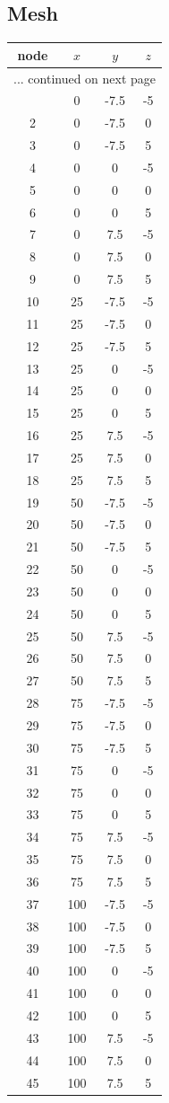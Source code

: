 \documentclass{article}%
\begin{document}
\subsection{Mesh}%
\label{subsec:Mesh}%
\begin{longtable}{| c | c c c |}%
\hline%
node&$x$&$y$&$z$\\%
\hline%
\endhead%
\hline%
\multicolumn{4}{r}{... continued on next page}\\%
\endfoot%
\hline%
\endlastfoot%
1&0&{-}7.5&{-}5\\%
2&0&{-}7.5&0\\%
3&0&{-}7.5&5\\%
4&0&0&{-}5\\%
5&0&0&0\\%
6&0&0&5\\%
7&0&7.5&{-}5\\%
8&0&7.5&0\\%
9&0&7.5&5\\%
10&25&{-}7.5&{-}5\\%
11&25&{-}7.5&0\\%
12&25&{-}7.5&5\\%
13&25&0&{-}5\\%
14&25&0&0\\%
15&25&0&5\\%
16&25&7.5&{-}5\\%
17&25&7.5&0\\%
18&25&7.5&5\\%
19&50&{-}7.5&{-}5\\%
20&50&{-}7.5&0\\%
21&50&{-}7.5&5\\%
22&50&0&{-}5\\%
23&50&0&0\\%
24&50&0&5\\%
25&50&7.5&{-}5\\%
26&50&7.5&0\\%
27&50&7.5&5\\%
28&75&{-}7.5&{-}5\\%
29&75&{-}7.5&0\\%
30&75&{-}7.5&5\\%
31&75&0&{-}5\\%
32&75&0&0\\%
33&75&0&5\\%
34&75&7.5&{-}5\\%
35&75&7.5&0\\%
36&75&7.5&5\\%
37&100&{-}7.5&{-}5\\%
38&100&{-}7.5&0\\%
39&100&{-}7.5&5\\%
40&100&0&{-}5\\%
41&100&0&0\\%
42&100&0&5\\%
43&100&7.5&{-}5\\%
44&100&7.5&0\\%
45&100&7.5&5\\%
\end{longtable}%
\end{document}
